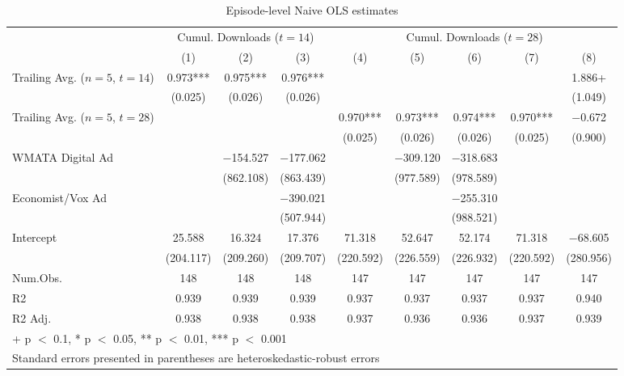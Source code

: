 \begin{table}

\caption{Episode-level Naive OLS estimates \label{tab:ep-level-naive-ols}}
\centering
\begin{tabular}[t]{lcccccccc}
\toprule
\multicolumn{1}{c}{ } & \multicolumn{3}{c}{Cumul. Downloads ($t=14$)} & \multicolumn{5}{c}{Cumul. Downloads ($t=28$)} \\
\cmidrule(l{3pt}r{3pt}){2-4} \cmidrule(l{3pt}r{3pt}){5-9}
  & (1) & (2) & (3) & (4) & (5) & (6) & (7) & (8)\\
\midrule
Trailing Avg. ($n=5$, $t=14$) & \num{0.973}*** & \num{0.975}*** & \num{0.976}*** &  &  &  &  & \num{1.886}+\\
 & (\num{0.025}) & (\num{0.026}) & (\num{0.026}) &  &  &  &  & (\num{1.049})\\
Trailing Avg. ($n=5$, $t=28$) &  &  &  & \num{0.970}*** & \num{0.973}*** & \num{0.974}*** & \num{0.970}*** & \num{-0.672}\\
 &  &  &  & (\num{0.025}) & (\num{0.026}) & (\num{0.026}) & (\num{0.025}) & (\num{0.900})\\
WMATA Digital Ad &  & \num{-154.527} & \num{-177.062} &  & \num{-309.120} & \num{-318.683} &  & \\
 &  & (\num{862.108}) & (\num{863.439}) &  & (\num{977.589}) & (\num{978.589}) &  & \\
Economist/Vox Ad &  &  & \num{-390.021} &  &  & \num{-255.310} &  & \\
 &  &  & (\num{507.944}) &  &  & (\num{988.521}) &  & \\
Intercept & \num{25.588} & \num{16.324} & \num{17.376} & \num{71.318} & \num{52.647} & \num{52.174} & \num{71.318} & \num{-68.605}\\
 & (\num{204.117}) & (\num{209.260}) & (\num{209.707}) & (\num{220.592}) & (\num{226.559}) & (\num{226.932}) & (\num{220.592}) & (\num{280.956})\\
\midrule
Num.Obs. & \num{148} & \num{148} & \num{148} & \num{147} & \num{147} & \num{147} & \num{147} & \num{147}\\
R2 & \num{0.939} & \num{0.939} & \num{0.939} & \num{0.937} & \num{0.937} & \num{0.937} & \num{0.937} & \num{0.940}\\
R2 Adj. & \num{0.938} & \num{0.938} & \num{0.938} & \num{0.937} & \num{0.936} & \num{0.936} & \num{0.937} & \num{0.939}\\
\bottomrule
\multicolumn{9}{l}{\rule{0pt}{1em}+ p $<$ 0.1, * p $<$ 0.05, ** p $<$ 0.01, *** p $<$ 0.001}\\
\multicolumn{9}{l}{\rule{0pt}{1em}Standard errors presented in parentheses are heteroskedastic-robust errors}\\
\end{tabular}
\end{table}
